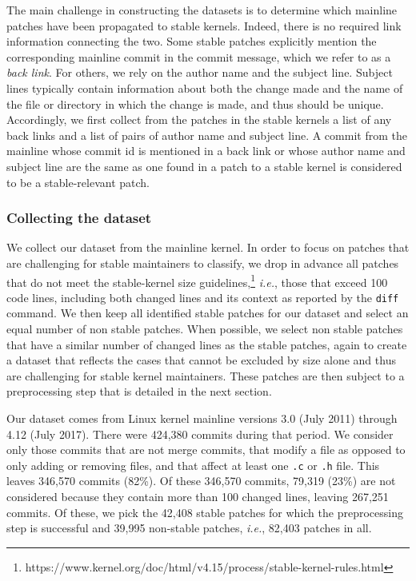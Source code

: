 The main challenge in constructing the datasets is to determine which
mainline patches have been propagated to stable kernels.  Indeed, there is
no required link information connecting the two.  Some stable patches
explicitly mention the corresponding mainline commit in the commit message,
which we refer to as a {\em back link}. For others, we rely on the author
name and the subject line. Subject lines typically contain information
about both the change made and the name of the file or directory in which
the change is made, and thus should be unique.  Accordingly, we first
collect from the patches in the stable kernels a list of any back
links and a list of pairs of author name and subject line.  A commit from
the mainline whose commit id is mentioned in a back link or whose author
name and subject line are the same as one found in a patch to a stable
kernel is considered to be a stable-relevant patch.

\subsubsection{Collecting the dataset}
\label{sec:mainline_patch}

We collect our dataset from the mainline kernel.  In order to focus on
patches that are challenging for stable maintainers to classify, we drop in
advance all patches that do not meet the stable-kernel size
guidelines,\footnote{https://www.kernel.org/doc/html/v4.15/process/stable-kernel-rules.html}
{\em i.e.}, those that exceed 100 code lines, including both changed lines
and its context as reported by the {\tt diff} command.  We then keep all
identified stable patches for our dataset and select an equal number of non
stable patches.  When possible, we select non stable patches that have a
similar number of changed lines as the stable patches, again to create a
dataset that reflects the cases that cannot be excluded by size alone and
thus are challenging for stable kernel maintainers.  These patches are then
subject to a preprocessing step that is detailed in the next section.

Our dataset comes from Linux kernel mainline versions 3.0 (July 2011)
through 4.12 (July 2017). There were 424,380 commits during that period.  We
consider only those commits that are not merge commits, that modify a file
as opposed to only adding or removing files, and that affect at least one
{\tt .c} or {\tt .h} file.  This leaves 346,570 commits (82\%).  Of these
346,570 commits, 79,319 (23\%) are not considered because they contain more
than 100 changed lines, leaving 267,251 commits.  Of these, we pick the
42,408 stable patches for which the preprocessing step is successful and
39,995 non-stable patches, {\em i.e.}, 82,403 patches in all.

